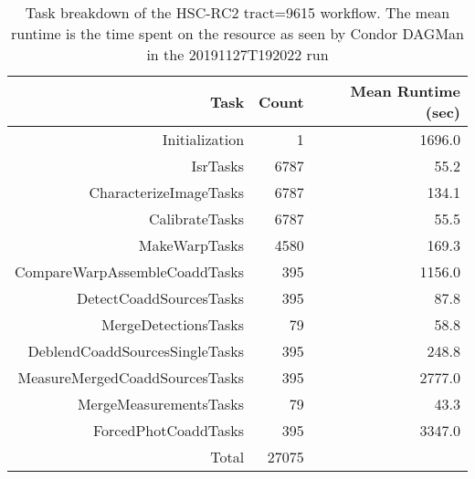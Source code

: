 \begin{table}
\centering
\begin{tabular} {|r|r|r|}
\hline
{Task}&{Count}    &{Mean Runtime (sec)} \\ \hline
Initialization&1  & 1696.0 \\
IsrTasks&6787     &55.2 \\
CharacterizeImageTasks&6787 &134.1   \\
CalibrateTasks&6787  &55.5  \\
MakeWarpTasks&4580   &169.3 \\
CompareWarpAssembleCoaddTasks&395 & 1156.0  \\
DetectCoaddSourcesTasks&395   &87.8 \\
MergeDetectionsTasks&79       &58.8\\
DeblendCoaddSourcesSingleTasks&395  &248.8   \\
MeasureMergedCoaddSourcesTasks&395  &2777.0  \\
MergeMeasurementsTasks&79   &43.3 \\
ForcedPhotCoaddTasks&395    &3347.0\\ \hline
Total&27075   & \\ \hline
\end{tabular}
\caption{Task breakdown of the HSC-RC2 tract=9615 workflow.
The mean runtime is the time spent on the resource as seen by Condor DAGMan in the 20191127T192022 run}
\label{tab:taskBreakdown}
\end{table}
